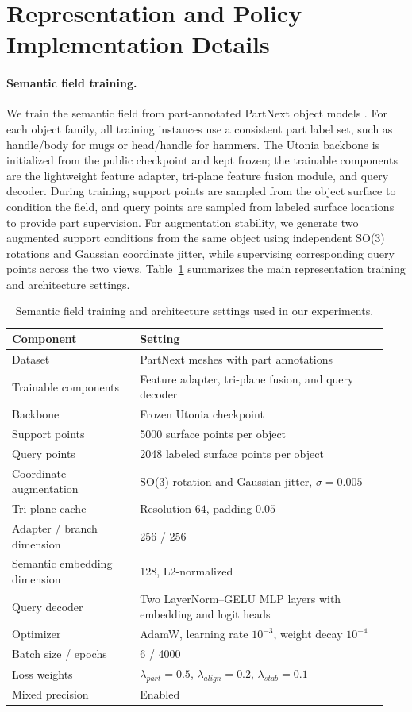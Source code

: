 \section{Representation and Policy Implementation Details}
\label{app:representation_policy_details}

\paragraph{Semantic field training.}
We train the semantic field from part-annotated PartNext object models \cite{wang2026partnext}. For each object family, all training instances use a consistent part label set, such as handle/body for mugs or head/handle for hammers. The Utonia backbone is initialized from the public checkpoint and kept frozen; the trainable components are the lightweight feature adapter, tri-plane feature fusion module, and query decoder. During training, support points are sampled from the object surface to condition the field, and query points are sampled from labeled surface locations to provide part supervision. For augmentation stability, we generate two augmented support conditions from the same object using independent SO(3) rotations and Gaussian coordinate jitter, while supervising corresponding query points across the two views. Table~\ref{tab:semantic_field_hparams} summarizes the main representation training and architecture settings.

\begin{table}[h]
\centering
\small
\caption{Semantic field training and architecture settings used in our experiments.}
\label{tab:semantic_field_hparams}
\begin{tabular}{@{}p{0.32\linewidth}p{0.62\linewidth}@{}}
\toprule
Component & Setting \\
\midrule
Dataset & PartNext meshes with part annotations \\
Trainable components & Feature adapter, tri-plane fusion, and query decoder \\
Backbone & Frozen Utonia checkpoint \\
Support points & 5000 surface points per object \\
Query points & 2048 labeled surface points per object \\
Coordinate augmentation & SO(3) rotation and Gaussian jitter, $\sigma=0.005$ \\
Tri-plane cache & Resolution $64$, padding $0.05$ \\
Adapter / branch dimension & 256 / 256 \\
Semantic embedding dimension & 128, L2-normalized \\
Query decoder & Two LayerNorm--GELU MLP layers with embedding and logit heads \\
Optimizer & AdamW, learning rate $10^{-3}$, weight decay $10^{-4}$ \\
Batch size / epochs & 6 / 4000 \\
Loss weights & $\lambda_{part}=0.5$, $\lambda_{align}=0.2$, $\lambda_{stab}=0.1$ \\
Mixed precision & Enabled \\
\bottomrule
\end{tabular}
\end{table}

